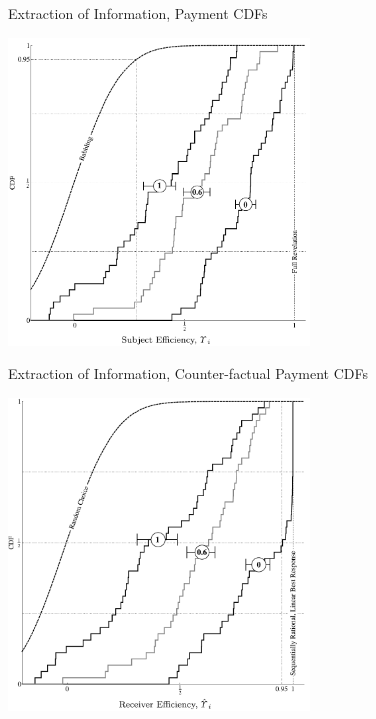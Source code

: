 \documentclass{beamer}
\begin{document}
\begin{frame}{Extraction of Information, Payment CDFs}
	\begin{center}
        \includegraphics[width=0.6\textwidth]{./i/vw_SubEff1.png}
	\end{center}
\end{frame}
\begin{frame}{Extraction of Information, Counter-factual Payment CDFs}
	\begin{center}
        \includegraphics[width=0.6\textwidth]{./i/vw_SubEff2.png}
	\end{center}
\end{frame}
\end{document}
